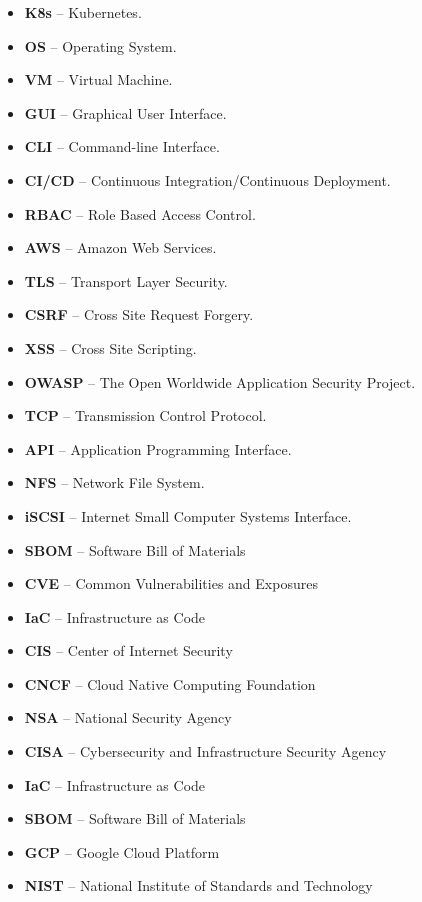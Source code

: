 \begin{itemize}
    \setlength\itemsep{1px}
    \item \textbf{K8s} -- Kubernetes.
    \item \textbf{OS} -- Operating System.
    \item \textbf{VM} -- Virtual Machine.
    \item \textbf{GUI} -- Graphical User Interface.
    \item \textbf{CLI} -- Command-line Interface.
    \item \textbf{CI/CD} -- Continuous Integration/Continuous Deployment.
    \item \textbf{RBAC} -- Role Based Access Control.
    \item \textbf{AWS} -- Amazon Web Services.
    \item \textbf{TLS} -- Transport Layer Security.
    \item \textbf{CSRF} -- Cross Site Request Forgery.
    \item \textbf{XSS} -- Cross Site Scripting.
    \item \textbf{OWASP} -- The Open Worldwide Application Security Project.
    \item \textbf{TCP} -- Transmission Control Protocol.
    \item \textbf{API} -- Application Programming Interface.
    \item \textbf{NFS} -- Network File System.
    \item \textbf{iSCSI} -- Internet Small Computer Systems Interface.
    \item \textbf{SBOM} -- Software Bill of Materials
    \item \textbf{CVE} -- Common Vulnerabilities and Exposures
    \item \textbf{IaC} -- Infrastructure as Code
    \item \textbf{CIS} -- Center of Internet Security
    \item \textbf{CNCF} -- Cloud Native Computing Foundation
    \item \textbf{NSA} -- National Security Agency
    \item \textbf{CISA} -- Cybersecurity and Infrastructure Security Agency
    \item \textbf{IaC} -- Infrastructure as Code
    \item \textbf{SBOM} -- Software Bill of Materials
    \item \textbf{GCP} -- Google Cloud Platform
    \item \textbf{NIST} -- National Institute of Standards and Technology

\end{itemize}
